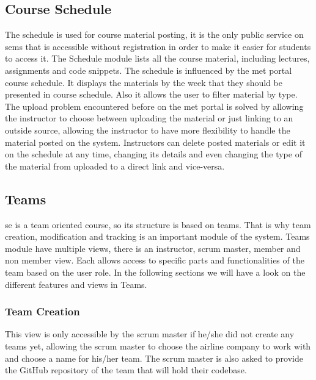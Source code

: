 \subsection{Course Schedule}
\label{sub:schedule}
The schedule is used for course material posting, it is the only public service on \ac{sems} that is accessible without registration in order to make
it easier for students to access it. The Schedule module lists all the course material, including lectures, assignments and code snippets. The schedule
is influenced by the \ac{met} portal course schedule. It displays the materials by the week that they should be presented in course schedule. Also it
allows the user to filter material by type. The upload problem encountered before on the \ac{met} portal is solved by allowing the instructor to choose between
uploading the material or just linking to an outside source, allowing the instructor to have more flexibility to handle the material posted on the system.
Instructors can delete posted materials or edit it on the schedule at any time, changing its details and even changing the type of the material from
uploaded to a direct link and vice-versa.

\subsection{Teams}
\label{sub:teams}
\ac{se} is a team oriented course, so its structure is based on teams. That is why team creation, modification and tracking is an
important module of the system. Teams module have multiple views, there is an instructor, scrum master, member and non member view. Each
allows access to specific parts and functionalities of the team based on the user role.
In the following sections we will have a look on the different features and views in Teams.

\subsubsection{Team Creation}
\label{subs:team-creation}
This view is only accessible by the scrum master if he/she did not create any teams yet, allowing the scrum master to choose the airline company
to work with and choose a name for his/her team. The scrum master is also asked to provide the GitHub repository of the team that will hold
their codebase.

